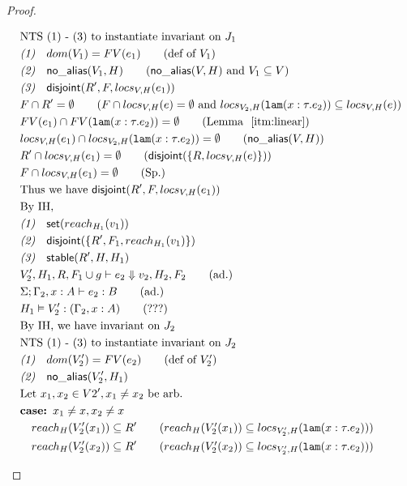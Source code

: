 \documentclass[11pt]{article}
\newcommand{\ms}[1]{\ensuremath{\mathsf{#1}}}
\newcommand{\irl}[1]{\mathtt{#1}}
\newcommand{\na}[1]{\mathsf{no\_alias}(#1)}
\newcommand{\stable}[1]{\mathsf{stable}(#1)}
\newcommand{\dist}[1]{\mathsf{disjoint}(#1)}
\theoremstyle{definition}
\begin{document}
\begin{proof}
\begin{description}
\begin{align*}
  &\text{NTS (1) - (3) to instantiate invariant on } J_1\\
  &\emph{(1)}\quad dom(V_1) = FV(e_1) \tag{def of $V_1$}\\
  &\emph{(2)}\quad \na{V_1,H} \tag{$\na{V,H}$ and $V_1 \subseteq V$}\\
  &\emph{(3)}\quad \dist{R',F,locs_{V,H}(e_1)}\\
  &F \cap R' = \emptyset \tag{$F \cap locs_{V,H}(e) = \emptyset$ and $locs_{V_2,H}(\irl{lam}(x : \tau. e_2)) \subseteq locs_{V,H}(e)$}\\
  &FV(e_1) \cap FV(\irl{lam}(x : \tau. e_2)) = \emptyset \tag{Lemma ~\ref{itm:linear}}\\
  &locs_{V,H}(e_1) \cap locs_{V_2,H}(\irl{lam}(x : \tau. e_2)) = \emptyset \tag{$\na{V,H}$}\\
  &R' \cap locs_{V,H}(e_1) = \emptyset \tag{$\dist{\{R,locs_{V,H}(e)\}}$}\\
  &F \cap locs_{V,H}(e_1) = \emptyset \tag{Sp.}\\
  &\text{Thus we have } \dist{R',F,locs_{V,H}(e_1)}\\
  &\text{By IH, }\\
  &\emph{(1)}\quad \ms{set}(reach_{H_1}(v_1))\\
  &\emph{(2)}\quad \dist{\{R',F_1,reach_{H_1}(v_1)\}}\\
  &\emph{(3)}\quad \stable{R',H,H_1}\\
  &V_2',H_1,R, F_1 \cup g \vdash e_2 \Downarrow v_2,H_2,F_2 \tag{ad.} \\
  &\Sigma; \Gamma_2, x : A \vdash e_2 : B \tag{ad.}\\
  &H_1 \vDash V_2' : (\Gamma_2, x : A) \tag{???}\\
  &\text{By IH, we have invariant on } J_2\\
  &\text{NTS (1) - (3) to instantiate invariant on } J_2\\
  &\emph{(1)}\quad dom(V_2') = FV(e_2) \tag{def of $V_2'$}\\
  &\emph{(2)}\quad \na{V_2',H_1}\\
  &\text{Let } x_1, x_2 \in V2', x_1 \ne x_2 \text{ be arb.}\\
  &\textbf{case: } x_1 \ne x, x_2 \ne x\\
  &\quad reach_H(V_2'(x_1)) \subseteq R' \tag{$reach_H(V_2'(x_1)) \subseteq locs_{V_2',H}(\irl{lam}(x : \tau. e_2))$}\\
  &\quad reach_H(V_2'(x_2)) \subseteq R' \tag{$reach_H(V_2'(x_2)) \subseteq locs_{V_2',H}(\irl{lam}(x : \tau. e_2))$}\\

\end{align*}
\end{description}
\end{proof}
\end{document}
